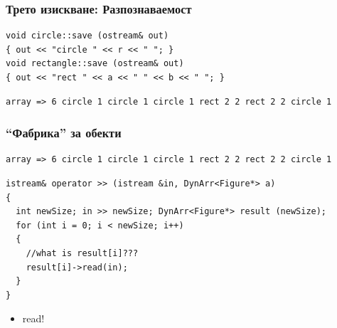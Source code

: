 \documentclass{beamer}
\begin{document}
\begin{frame}[fragile]
\frametitle{Трето изискване: Разпознаваемост}

\begin{flushleft}
\begin{lstlisting}
void circle::save (ostream& out)
{ out << "circle " << r << " "; }
void rectangle::save (ostream& out)
{ out << "rect " << a << " " << b << " "; }
\end{lstlisting}  
\end{flushleft}

\begin{flushleft}
\begin{lstlisting}
array => 6 circle 1 circle 1 circle 1 rect 2 2 rect 2 2 circle 1 
\end{lstlisting}  
\end{flushleft}

\end{frame}



\begin{frame}[fragile]
\frametitle{``Фабрика'' за обекти}


\begin{flushleft}
\begin{lstlisting}
array => 6 circle 1 circle 1 circle 1 rect 2 2 rect 2 2 circle 1 
\end{lstlisting}  
\end{flushleft}

\begin{flushleft}
\begin{lstlisting}
istream& operator >> (istream &in, DynArr<Figure*> a)
{
  int newSize; in >> newSize; DynArr<Figure*> result (newSize);
  for (int i = 0; i < newSize; i++)
  {
    //what is result[i]???
    result[i]->read(in);
  }
}
\end{lstlisting}  
\end{flushleft}
\begin{itemize}
  \item read!
\end{itemize}

\end{frame}
\end{document}
